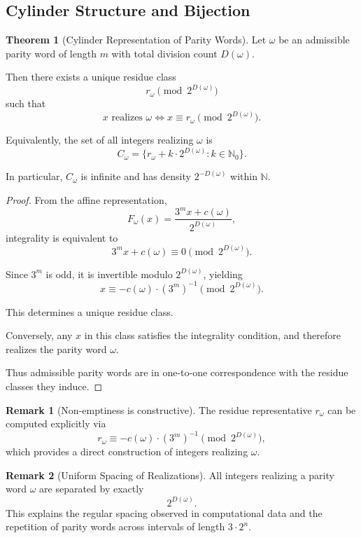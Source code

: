 \documentclass[12pt, oneside]{article}   	%
\numberwithin{equation}{section}          %
\theoremstyle{definition}
\newtheorem{theorem}{Theorem}
\newtheorem*{remark}{Remark}
\begin{document}
\subsection{Cylinder Structure and Bijection}
\label{sec:cylinders}

\begin{theorem}[Cylinder Representation of Parity Words]
\label{thm:cylinder}
Let $\omega$ be an admissible parity word of length $m$ with total division count $D(\omega)$.

Then there exists a unique residue class
\[
r_\omega \pmod{2^{D(\omega)}}
\]
such that
\[
x \text{ realizes } \omega \iff x \equiv r_\omega \pmod{2^{D(\omega)}}.
\]

Equivalently, the set of all integers realizing $\omega$ is
\[
C_\omega = \{ r_\omega + k \cdot 2^{D(\omega)} : k \in \mathbb{N}_0 \}.
\]

In particular, $C_\omega$ is infinite and has density $2^{-D(\omega)}$
within $\mathbb{N}$.
\end{theorem}

\begin{proof}
From the affine representation,
\[
F_\omega(x) = \frac{3^m x + c(\omega)}{2^{D(\omega)}},
\]
integrality is equivalent to
\[
3^m x + c(\omega) \equiv 0 \pmod{2^{D(\omega)}}.
\]

Since $3^m$ is odd, it is invertible modulo $2^{D(\omega)}$, yielding
\[
x \equiv -c(\omega) \cdot (3^m)^{-1} \pmod{2^{D(\omega)}}.
\]

This determines a unique residue class.

Conversely, any $x$ in this class satisfies the integrality condition,
and therefore realizes the parity word $\omega$.

Thus admissible parity words are in one-to-one correspondence with the residue
classes they induce.
\end{proof}

\begin{remark}[Non-emptiness is constructive]
The residue representative $r_\omega$ can be computed explicitly via
\[
r_\omega \equiv -c(\omega)\cdot (3^m)^{-1} \pmod{2^{D(\omega)}},
\]
which provides a direct construction of integers realizing $\omega$.
\end{remark}

\begin{remark}[Uniform Spacing of Realizations]
\label{rem:spacing}
All integers realizing a parity word $\omega$ are separated by exactly
\[
2^{D(\omega)}.
\]
This explains the regular spacing observed in computational data and
the repetition of parity words across intervals of length $3 \cdot 2^n$.
\end{remark}
\end{document}
